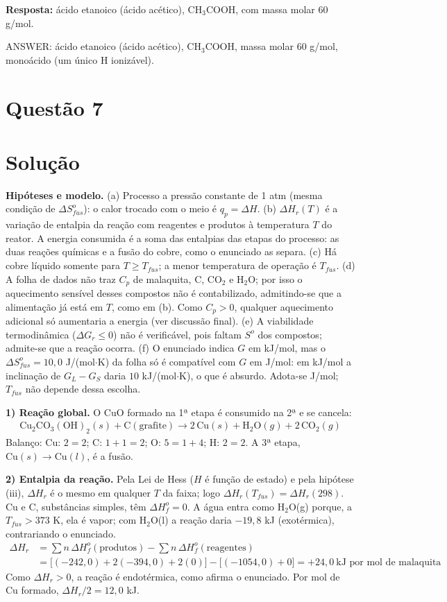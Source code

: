 \documentclass{article}%
\begin{document}
\textbf{Resposta:} ácido etanoico (ácido acético), $\text{CH}_3\text{COOH}$, com massa molar 60 g/mol.

ANSWER: ácido etanoico (ácido acético), $\text{CH}_3\text{COOH}$, massa molar 60 g/mol, monoácido (um único H ionizável).%
\newpage%
\section*{Questão 7}

\section*{Solução}

\textbf{Hipóteses e modelo.} (a) Processo a pressão constante de 1 atm (mesma condição de $\Delta S^o_{fus}$): o calor trocado com o meio é $q_p=\Delta H$. (b) $\Delta H_r(T)$ é a variação de entalpia da reação com reagentes e produtos à temperatura $T$ do reator. A energia consumida é a soma das entalpias das etapas do processo: as duas reações químicas e a fusão do cobre, como o enunciado as separa. (c) Há cobre líquido somente para $T\ge T_{fus}$; a menor temperatura de operação é $T_{fus}$. (d) A folha de dados não traz $C_p$ de malaquita, C, CO$_2$ e H$_2$O; por isso o aquecimento sensível desses compostos não é contabilizado, admitindo-se que a alimentação já está em $T$, como em (b). Como $C_p>0$, qualquer aquecimento adicional só aumentaria a energia (ver discussão final). (e) A viabilidade termodinâmica ($\Delta G_r\le 0$) não é verificável, pois faltam $S^o$ dos compostos; admite-se que a reação ocorra. (f) O enunciado indica $G$ em kJ/mol, mas o $\Delta S^o_{fus}=10{,}0$ J/(mol$\cdot$K) da folha só é compatível com $G$ em J/mol: em kJ/mol a inclinação de $G_L-G_S$ daria $10$ kJ/(mol$\cdot$K), o que é absurdo. Adota-se J/mol; $T_{fus}$ não depende dessa escolha.

\textbf{1) Reação global.} O CuO formado na 1ª etapa é consumido na 2ª e se cancela:
\begin{align*}
\text{Cu}_2\text{CO}_3(\text{OH})_2(s)+\text{C}(\text{grafite})\longrightarrow 2\,\text{Cu}(s)+\text{H}_2\text{O}(g)+2\,\text{CO}_2(g)
\end{align*}
Balanço: Cu: $2=2$; C: $1+1=2$; O: $5=1+4$; H: $2=2$. A 3ª etapa, $\text{Cu}(s)\to\text{Cu}(l)$, é a fusão.

\textbf{2) Entalpia da reação.} Pela Lei de Hess ($H$ é função de estado) e pela hipótese (iii), $\Delta H_r$ é o mesmo em qualquer $T$ da faixa; logo $\Delta H_r(T_{fus})=\Delta H_r(298)$. Cu e C, substâncias simples, têm $\Delta H^o_f=0$. A água entra como H$_2$O(g) porque, a $T_{fus}>373$ K, ela é vapor; com H$_2$O(l) a reação daria $-19{,}8$ kJ (exotérmica), contrariando o enunciado.
\begin{align*}
\Delta H_r&=\sum n\,\Delta H^o_f(\text{produtos})-\sum n\,\Delta H^o_f(\text{reagentes})\\
&=\big[(-242{,}0)+2(-394{,}0)+2(0)\big]-\big[(-1054{,}0)+0\big]=+24{,}0\ \text{kJ por mol de malaquita}
\end{align*}
Como $\Delta H_r>0$, a reação é endotérmica, como afirma o enunciado. Por mol de Cu formado, $\Delta H_r/2=12{,}0$ kJ.
\end{document}
